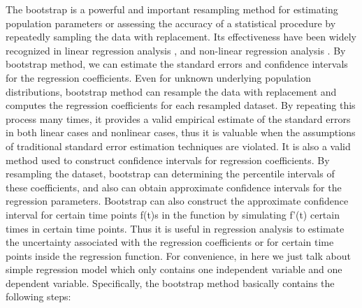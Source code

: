 \documentclass[12pt]{article}
\begin{document}
The bootstrap is a powerful and important resampling method for estimating population parameters or assessing the accuracy of a statistical procedure by repeatedly sampling the data with replacement. Its effectiveness have been widely recognized in linear regression analysis \cite{efron1979bootstrap}, and non-linear regression analysis \cite{davidson1999bootstrap}. By bootstrap method, we can estimate the standard errors and confidence intervals for the regression coefficients. Even for unknown underlying population distributions, bootstrap method can resample the data with replacement and computes the regression coefficients for each resampled dataset. \cite{hall2013simple}By repeating this process many times, it provides a valid empirical estimate of the standard errors in both linear cases \cite{efron1985bootstrap} and nonlinear cases\cite{wong2019bootstrap}, thus it is valuable when the assumptions of traditional standard error estimation techniques are violated. It is also a valid method used to construct confidence intervals for regression coefficients. \cite{efron1985bootstrap}By resampling the dataset, bootstrap can determining the percentile intervals of these coefficients, and also can obtain approximate confidence intervals for the regression parameters. \cite{cui2012evaluating} Bootstrap can also construct the approximate confidence interval for certain time points f(t)s in the function by simulating f'(t) certain times in certain time points. \cite{horowitz2018bootstrap} Thus it is useful in regression analysis to estimate the uncertainty associated with the regression coefficients or for certain time points inside the regression function. \cite{Efron2011-sn}For convenience, in here we just talk about simple regression model which only contains one independent variable and one dependent variable. Specifically, the bootstrap method basically contains the following steps:
\end{document}
